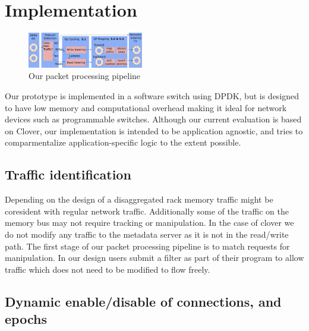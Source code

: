 \section{Implementation}

\begin{figure}
    \includegraphics[width=0.45\textwidth]{fig/packet_processing.pdf}
    \caption{Our packet processing pipeline}
    \label{fig:system}
\end{figure}

Our prototype is implemented in a software switch using DPDK, but is
designed to have low memory and computational overhead making it ideal
for network devices such as programmable switches.  Although our
current evaluation is based on Clover, our implementation is intended
to be application agnostic, and tries to comparmentalize
application-specific logic to the extent possible.



\subsection{Traffic identification} Depending on the design of a disaggregated
rack memory traffic might be coresident with regular network traffic.
Additionally some of the traffic on the memory bus may not require tracking or
manipulation. In the case of clover we do not modify any traffic to the metadata
server as it is not in the read/write path. The first stage of our packet
processing pipeline is to match requests for manipulation. In our design users
submit a filter as part of their program to allow traffic which does not need to
be modified to flow freely.

\subsection{Dynamic enable/disable of connections, and epochs}


